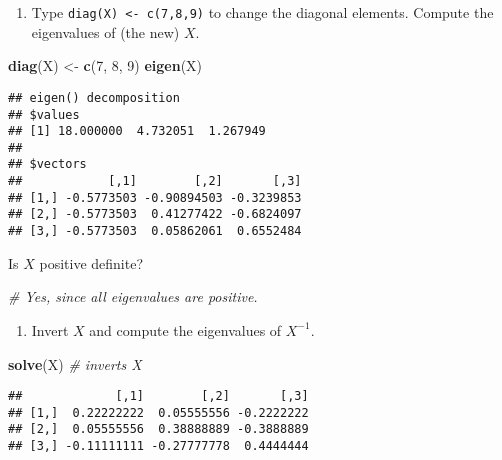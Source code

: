 \documentclass[]{article}
\newenvironment{Shaded}{\begin{snugshade}}{\end{snugshade}}
\newcommand{\KeywordTok}[1]{\textcolor[rgb]{0.13,0.29,0.53}{\textbf{#1}}}
\newcommand{\DecValTok}[1]{\textcolor[rgb]{0.00,0.00,0.81}{#1}}
\newcommand{\StringTok}[1]{\textcolor[rgb]{0.31,0.60,0.02}{#1}}
\newcommand{\CommentTok}[1]{\textcolor[rgb]{0.56,0.35,0.01}{\textit{#1}}}
\newcommand{\NormalTok}[1]{#1}
\providecommand{\tightlist}{%
  \setlength{\itemsep}{0pt}\setlength{\parskip}{0pt}}
\begin{document}
\begin{enumerate}
\def\labelenumi{\arabic{enumi}.}
\setcounter{enumi}{2}
\tightlist
\item
  Type \texttt{diag(X)\ \textless{}-\ c(7,8,9)} to change the diagonal
  elements. Compute the eigenvalues of (the new) \(X\).
\end{enumerate}

\begin{Shaded}
\begin{Highlighting}[]
\KeywordTok{diag}\NormalTok{(X) <-}\StringTok{ }\KeywordTok{c}\NormalTok{(}\DecValTok{7}\NormalTok{, }\DecValTok{8}\NormalTok{, }\DecValTok{9}\NormalTok{)}
\KeywordTok{eigen}\NormalTok{(X)}
\end{Highlighting}
\end{Shaded}

\begin{verbatim}
## eigen() decomposition
## $values
## [1] 18.000000  4.732051  1.267949
## 
## $vectors
##            [,1]        [,2]       [,3]
## [1,] -0.5773503 -0.90894503 -0.3239853
## [2,] -0.5773503  0.41277422 -0.6824097
## [3,] -0.5773503  0.05862061  0.6552484
\end{verbatim}

Is \(X\) positive definite?

\begin{Shaded}
\begin{Highlighting}[]
\CommentTok{# Yes, since all eigenvalues are positive.}
\end{Highlighting}
\end{Shaded}

\begin{enumerate}
\def\labelenumi{\arabic{enumi}.}
\setcounter{enumi}{3}
\tightlist
\item
  Invert \(X\) and compute the eigenvalues of \(X^{-1}\).
\end{enumerate}

\begin{Shaded}
\begin{Highlighting}[]
\KeywordTok{solve}\NormalTok{(X)  }\CommentTok{# inverts X}
\end{Highlighting}
\end{Shaded}

\begin{verbatim}
##             [,1]        [,2]       [,3]
## [1,]  0.22222222  0.05555556 -0.2222222
## [2,]  0.05555556  0.38888889 -0.3888889
## [3,] -0.11111111 -0.27777778  0.4444444
\end{verbatim}
\end{document}
